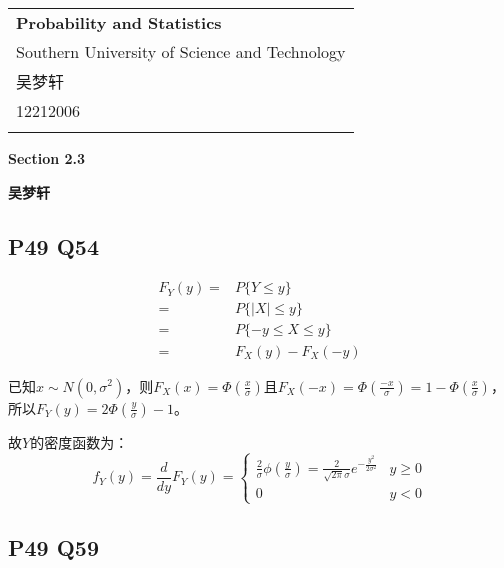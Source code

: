 \documentclass[a4paper,12pt]{ctexart}
\begin{document}
\thispagestyle{empty} %

\begin{tabular}{p{15.5cm}}
{\large \bf Probability and Statistics} \\
Southern University of Science and Technology \\ 吴梦轩 \\ 12212006 \\
\hline
\\
\end{tabular}

\vspace*{0.3cm} %

\begin{center}
	{\Large \bf Section 2.3}
	\vspace{2mm}

	{\bf 吴梦轩}
		
\end{center}  

\vspace{0.4cm}

\subsection*{P49 Q54}

\begin{align*}
	F_Y(y) =& P\{Y \leq y\} \\
	=& P\{|X| \leq y\} \\
	=& P\{-y \leq X \leq y\} \\
	=& F_X(y) - F_X(-y)
\end{align*}

已知$x \sim N(0, \sigma^2)$，则$F_X(x) = \Phi(\frac{x}{\sigma})$且$F_X(-x) = \Phi(\frac{-x}{\sigma}) = 1 - \Phi(\frac{x}{\sigma})$，所以$F_Y(y) = 2\Phi(\frac{y}{\sigma}) - 1$。

故$Y$的密度函数为：
\begin{equation*}
	f_Y(y) = \frac{d}{dy}F_Y(y) =
	\begin{cases}
		\frac{2}{\sigma}\phi(\frac{y}{\sigma}) = \frac{2}{\sqrt{2\pi}\sigma}e^{-\frac{y^2}{2\sigma^2}} & y \geq 0 \\
		0 & y < 0
	\end{cases}
\end{equation*}

\subsection*{P49 Q59}
\end{document}
